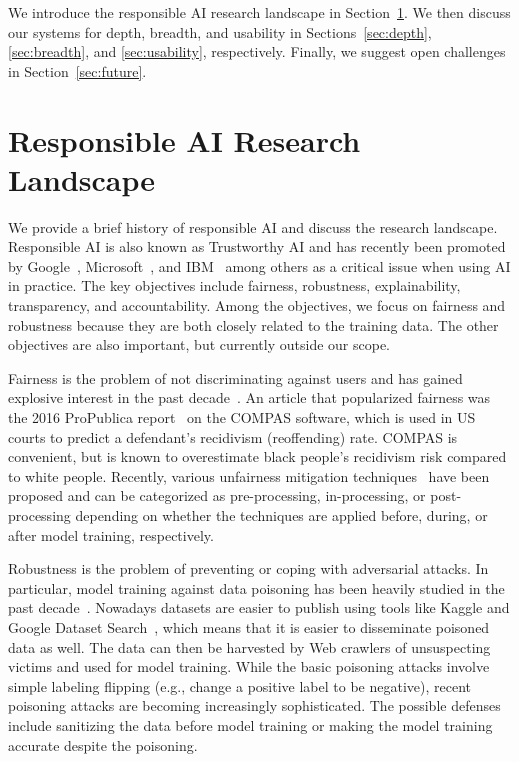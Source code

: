 \documentclass[11pt]{article}
\begin{document}
We introduce the responsible AI research landscape in Section~\ref{sec:landscape}. We then discuss our systems for depth, breadth, and usability in Sections~\ref{sec:depth}, \ref{sec:breadth}, and \ref{sec:usability}, respectively. Finally, we suggest open challenges in Section~\ref{sec:future}.



\section{Responsible AI Research Landscape}
\label{sec:landscape}

We provide a brief history of responsible AI and discuss the research landscape. Responsible AI is also known as Trustworthy AI and has recently been promoted by Google~\cite{google}, Microsoft~\cite{microsoft}, and IBM~\cite{ibm} among others as a critical issue when using AI in practice. The key objectives include fairness, robustness, explainability, transparency, and accountability. Among the objectives, we focus on fairness and robustness because they are both closely related to the training data. The other objectives are also important, but currently outside our scope.

Fairness is the problem of not discriminating against users and has gained explosive interest in the past decade~\cite{barocas-hardt-narayanan, DBLP:conf/pods/Venkatasubramanian19}. An article that popularized fairness was the 2016 ProPublica report~\cite{machinebias} on the COMPAS software, which is used in US courts to predict a defendant's recidivism (reoffending) rate. COMPAS is convenient, but is known to overestimate black people's recidivism risk compared to white people. Recently, various unfairness mitigation techniques~\cite{aif360-oct-2018} have been proposed and can be categorized as pre-processing, in-processing, or post-processing depending on whether the techniques are applied before, during, or after model training, respectively.

Robustness is the problem of preventing or coping with adversarial attacks. In particular, model training against data poisoning has been heavily studied in the past decade~\cite{DBLP:conf/sp/CretuSLSK08,DBLP:journals/corr/abs-2007-08199}. Nowadays datasets are easier to publish using tools like Kaggle and Google Dataset Search~\cite{DBLP:conf/semweb/BenjellounCN20}, which means that it is easier to disseminate poisoned data as well. The data can then be harvested by Web crawlers of unsuspecting victims and used for model training. While the basic poisoning attacks involve simple labeling flipping (e.g., change a positive label to be negative), recent poisoning attacks are becoming increasingly sophisticated.
The possible defenses include sanitizing the data before model training or making the model training accurate despite the poisoning.
\end{document}
